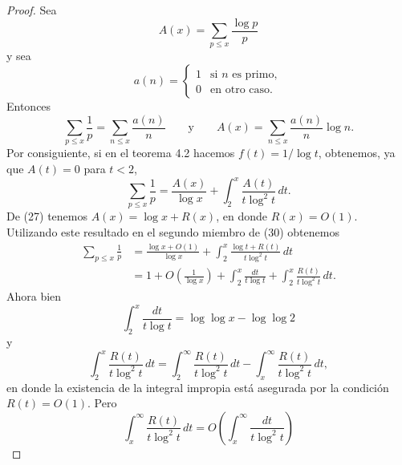 \documentclass[12pt,a4paper]{book}
\begin{document}
    \begin{proof}
        Sea
        \begin{equation*}
            A(x)=\sum_{p\leq x}\frac{\log p}{p}
        \end{equation*}
        y sea
        \begin{equation*}
            a(n)=
            \begin{cases}
                1 & \text{si } n \text{ es primo},\\
                0 & \text{en otro caso.}
            \end{cases}
        \end{equation*}
        Entonces
        \begin{equation*}
            \sum_{p\leq x}\frac{1}{p}=\sum_{n\leq x}\frac{a(n)}{n}\qquad\text{y}\qquad
            A(x)=\sum_{n\leq x}\frac{a(n)}{n}\log n.
        \end{equation*}
        Por consiguiente, si en el teorema 4.2 hacemos $f(t)=1/\log t$, obtenemos, ya
        que $A(t)=0$ para $t<2$,
        \begin{equation}
            \sum_{p\leq x}\frac{1}{p}=\frac{A(x)}{\log x}+\int_{2}^{x}\frac{A(t)}{t\log^{2}t}\,dt.
        \end{equation}
        De (27) tenemos $A(x)=\log x+R(x)$, en donde $R(x)=O(1)$. Utilizando este
        resultado en el segundo miembro de (30) obtenemos
        \begin{align}
            \sum_{p\leq x}\frac{1}{p}&=\frac{\log x+O(1)}{\log x}+\int_{2}^{x}\frac{\log t+R(t)}{t\log^{2}t}\,dt\\
            &=1+O\left(\frac{1}{\log x}\right)+\int_{2}^{x}\frac{dt}{t\log t}+\int_{2}^{x}\frac{R(t)}{t\log^{2}t}\,dt.
        \end{align}
        Ahora bien
        \begin{equation*}
            \int_{2}^{x}\frac{dt}{t\log t}=\log\log x-\log\log2
        \end{equation*}
        y
        \begin{equation*}
            \int_{2}^{x}\frac{R(t)}{t\log^{2}t}\,dt=\int_{2}^{\infty}\frac{R(t)}{t\log^{2}t}\,dt
            -\int_{x}^{\infty}\frac{R(t)}{t\log^{2}t}\,dt,
        \end{equation*}
        en donde la existencia de la integral impropia está asegurada por la condición
        $R(t)=O(1)$. Pero
        \begin{equation*}
            \int_{x}^{\infty}\frac{R(t)}{t\log^{2}t}\,dt=O\left(\int_{x}^{\infty}\frac{dt}{t\log^{2}t}\right)

\end{equation*}
\end{proof}
\end{document}
